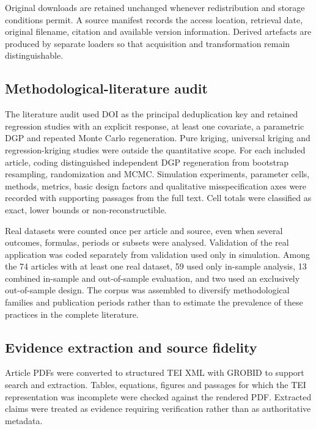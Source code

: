 \documentclass[10pt,a4paper]{article}
\begin{document}
Original downloads are retained unchanged whenever redistribution and storage
conditions permit. A source manifest records the access location, retrieval
date, original filename, citation and available version information. Derived
artefacts are produced by separate loaders so that acquisition and
transformation remain distinguishable.

\subsection*{Methodological-literature audit}

The literature audit used DOI as the principal deduplication key and retained
regression studies with an explicit response, at least one covariate, a
parametric DGP and repeated Monte Carlo regeneration. Pure kriging, universal
kriging and regression-kriging studies were outside the quantitative scope.
For each included article, coding distinguished independent DGP regeneration
from bootstrap resampling, randomization and MCMC. Simulation experiments,
parameter cells, methods, metrics, basic design factors and qualitative
misspecification axes were recorded with supporting passages from the full
text. Cell totals were classified as exact, lower bounds or
non-reconstructible.

Real datasets were counted once per article and source, even when several
outcomes, formulas, periods or subsets were analysed. Validation of the real
application was coded separately from validation used only in simulation.
Among the 74 articles with at least one real dataset, 59 used only in-sample
analysis, 13 combined in-sample and out-of-sample evaluation, and two used an
exclusively out-of-sample design. The corpus was assembled to diversify
methodological families and publication periods rather than to estimate the
prevalence of these practices in the complete literature.

\subsection*{Evidence extraction and source fidelity}

Article PDFs were converted to structured TEI XML with GROBID to support
search and extraction. Tables, equations, figures and passages for which the
TEI representation was incomplete were checked against the rendered PDF.
Extracted claims were treated as evidence requiring verification rather than
as authoritative metadata.
\end{document}

